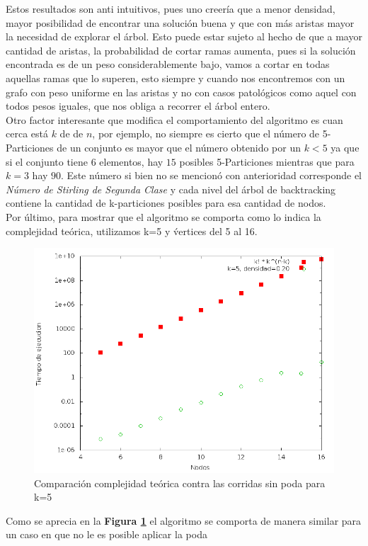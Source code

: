 Estos resultados son anti intuitivos, pues uno creer\'ia que a menor densidad, mayor posibilidad de encontrar una soluci\'on buena y que con m\'as aristas mayor la necesidad de explorar el \'arbol. Esto puede estar sujeto al hecho de que a mayor cantidad de aristas, la probabilidad de cortar ramas aumenta, pues si la soluci\'on encontrada es de un peso considerablemente bajo, vamos a cortar en todas aquellas ramas que lo superen, esto siempre y cuando nos encontremos con un grafo con peso uniforme en las aristas y no con casos patol\'ogicos como aquel con todos pesos iguales, que nos obliga a recorrer el \'arbol entero.
\\
Otro factor interesante que modifica el comportamiento del algoritmo es cuan cerca est\'a $k$ de de $n$, por ejemplo, no siempre es cierto que el n\'umero de 5-Particiones de un conjunto es mayor que el n\'umero obtenido por un $k<5$ ya que si el conjunto tiene $6$ elementos, hay $15$ posibles 5-Particiones mientras que para $k=3$ hay $90$. Este n\'umero si bien no se mencion\'o con anterioridad corresponde el \textit{N\'umero de Stirling de Segunda Clase} y cada nivel del \'arbol de backtracking contiene la cantidad de k-particiones posibles para esa cantidad de nodos.
\\
Por \'ultimo, para mostrar que el algoritmo se comporta como lo indica la complejidad te\'orica, utilizamos k=5 y \'vertices del 5 al 16.

\begin{figure}[H]
	\begin{center}
		\includegraphics[scale=0.4]{ej2/teorico_k_5.png}
	\end{center}
	\caption{Comparaci\'on complejidad te\'orica contra las corridas sin poda para k=5}
	\label{ej2_teorico_k_5}
\end{figure}

Como se aprecia en la \textbf{Figura \ref{ej2_teorico_k_5}} el algoritmo se comporta de manera similar para un caso en que no le es posible aplicar la poda